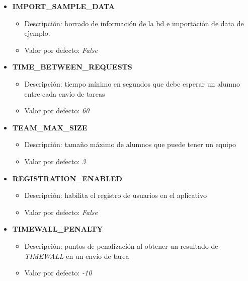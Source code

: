\documentclass[11pt,spanish,listoffigures,listoftables]{tfgetsinf}
\begin{document}
\begin{itemize}
	\item \textbf{IMPORT\_SAMPLE\_DATA}
	\begin{itemize}
		\item Descripción: borrado de información de la \acrlong{bd} e importación de data de ejemplo.
		\item Valor por defecto: \textit{False}
	\end{itemize}
\end{itemize}

\begin{itemize}
	\item \textbf{TIME\_BETWEEN\_REQUESTS}
	\begin{itemize}
		\item Descripción: tiempo mínimo en segundos que debe esperar un \Gls{alumno} entre cada envío de \Gls{tarea}s
		\item Valor por defecto: \textit{60}
	\end{itemize}
\end{itemize}

\begin{itemize}
	\item \textbf{TEAM\_MAX\_SIZE}
	\begin{itemize}
		\item Descripción: tamaño máximo de \Gls{alumno}s que puede tener un \Gls{equipo}
		\item Valor por defecto: \textit{3}
	\end{itemize}
\end{itemize}

\begin{itemize}
	\item \textbf{REGISTRATION\_ENABLED}
	\begin{itemize}
		\item Descripción: habilita el registro de usuarios en el aplicativo
		\item Valor por defecto: \textit{False}
	\end{itemize}
\end{itemize}

\begin{itemize}
	\item \textbf{TIMEWALL\_PENALTY}
	\begin{itemize}
		\item Descripción: puntos de penalización al obtener un resultado de \textit{TIMEWALL} en un envío de \Gls{tarea}
		\item Valor por defecto: \textit{-10}
	\end{itemize}
\end{itemize}
\end{document}
